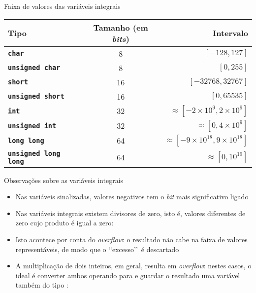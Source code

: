 \begin{frame}[fragile]{Faixa de valores das variáveis integrais}

    \begin{table}[!ht]
        \centering

        \begin{tabular}{lcr}
            \toprule
            \textbf{Tipo} & \textbf{Tamanho} (em \textit{bits}) & \textbf{Intervalo} \\
            \midrule
            \texttt{\textbf{char}} & 8 & $[-128, 127]$ \\
            \rowcolor[gray]{0.9}
            \texttt{\textbf{unsigned char}} & 8 & $[0, 255]$ \\
            \texttt{\textbf{short}} & 16 & $[-32768, 32767]$ \\
            \rowcolor[gray]{0.9}
            \texttt{\textbf{unsigned short}} & 16 & $[0, 65535]$ \\
            \texttt{\textbf{int}} & 32 & $\approx [-2\times 10^9, 2\times 10^9]$ \\
            \rowcolor[gray]{0.9}
            \texttt{\textbf{unsigned int}} & 32 & $\approx [0, 4\times 10^9]$ \\
            \texttt{\textbf{long long}} & 64 & $\approx [-9\times 10^{18}, 9\times 10^{18}]$ \\
            \rowcolor[gray]{0.9}
            \texttt{\textbf{unsigned long long}} & 64 & $\approx [0, 10^{19}]$ \\
            \bottomrule
        \end{tabular}
    \end{table}

\end{frame}

\begin{frame}[fragile]{Observações sobre as variáveis integrais}

    \begin{itemize}
        \item Nas variáveis sinalizadas, valores negativos tem o \textit{bit} mais significativo
            ligado

        \item Nas variáveis integrais existem divisores de zero, isto é, valores diferentes de
            zero cujo produto é igual a zero:

        \item Isto acontece por conta do \textit{overflow}: o resultado não cabe na faixa de
            valores representáveis, de modo que o \lq\lq excesso\rq\rq\ é descartado

        \item A multiplicação de dois inteiros, em geral, resulta em \textit{overflow}: nestes
            casos, o ideal é converter ambos operando para  e guardar o
            resultado uma variável também do tipo :
    \end{itemize}

\end{frame}

